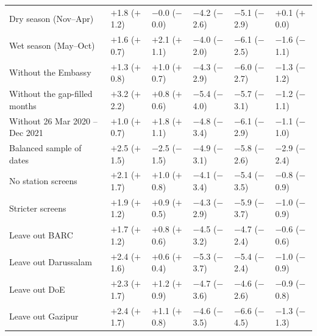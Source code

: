 \begin{longtable}{L{3.8cm} C{2.2cm} C{2.2cm} C{2.2cm} C{2.2cm} C{2.2cm}}
Dry season (Nov--Apr) & $+$1.8 {\scriptsize($+$1.2)} & $-$0.0 {\scriptsize($-$0.0)} & $-$4.2 {\scriptsize($-$2.6)} & $-$5.1 {\scriptsize($-$2.9)} & $+$0.1 {\scriptsize($+$0.0)} \\
Wet season (May--Oct) & $+$1.6 {\scriptsize($+$0.7)} & $+$2.1 {\scriptsize($+$1.1)} & $-$4.0 {\scriptsize($-$2.0)} & $-$6.1 {\scriptsize($-$2.5)} & $-$1.6 {\scriptsize($-$1.1)} \\
Without the Embassy & $+$1.3 {\scriptsize($+$0.8)} & $+$1.0 {\scriptsize($+$0.7)} & $-$4.3 {\scriptsize($-$2.9)} & $-$6.0 {\scriptsize($-$2.7)} & $-$1.3 {\scriptsize($-$1.2)} \\
Without the gap-filled months & $+$3.2 {\scriptsize($+$2.2)} & $+$0.8 {\scriptsize($+$0.6)} & $-$5.4 {\scriptsize($-$4.0)} & $-$5.7 {\scriptsize($-$3.1)} & $-$1.2 {\scriptsize($-$1.1)} \\
Without 26 Mar 2020 -- Dec 2021 & $+$1.0 {\scriptsize($+$0.7)} & $+$1.8 {\scriptsize($+$1.1)} & $-$4.8 {\scriptsize($-$3.4)} & $-$6.1 {\scriptsize($-$2.9)} & $-$1.1 {\scriptsize($-$1.0)} \\
Balanced sample of dates & $+$2.5 {\scriptsize($+$1.5)} & $-$2.5 {\scriptsize($-$1.5)} & $-$4.9 {\scriptsize($-$3.1)} & $-$5.8 {\scriptsize($-$2.6)} & $-$2.9 {\scriptsize($-$2.4)} \\
No station screens & $+$2.1 {\scriptsize($+$1.7)} & $+$1.0 {\scriptsize($+$0.8)} & $-$4.1 {\scriptsize($-$3.4)} & $-$5.4 {\scriptsize($-$3.5)} & $-$0.8 {\scriptsize($-$0.9)} \\
Stricter screens & $+$1.9 {\scriptsize($+$1.2)} & $+$0.9 {\scriptsize($+$0.5)} & $-$4.3 {\scriptsize($-$2.9)} & $-$5.9 {\scriptsize($-$3.7)} & $-$1.0 {\scriptsize($-$0.9)} \\
Leave out BARC & $+$1.7 {\scriptsize($+$1.2)} & $+$0.8 {\scriptsize($+$0.6)} & $-$4.5 {\scriptsize($-$3.2)} & $-$4.7 {\scriptsize($-$2.4)} & $-$0.6 {\scriptsize($-$0.6)} \\
Leave out Darussalam & $+$2.4 {\scriptsize($+$1.6)} & $+$0.6 {\scriptsize($+$0.4)} & $-$5.3 {\scriptsize($-$3.7)} & $-$5.4 {\scriptsize($-$2.4)} & $-$1.0 {\scriptsize($-$0.9)} \\
Leave out DoE & $+$2.3 {\scriptsize($+$1.7)} & $+$1.2 {\scriptsize($+$0.9)} & $-$4.7 {\scriptsize($-$3.6)} & $-$4.6 {\scriptsize($-$2.6)} & $-$0.9 {\scriptsize($-$0.8)} \\
Leave out Gazipur & $+$2.4 {\scriptsize($+$1.7)} & $+$1.1 {\scriptsize($+$0.8)} & $-$4.6 {\scriptsize($-$3.5)} & $-$6.6 {\scriptsize($-$4.5)} & $-$1.3 {\scriptsize($-$1.3)} \\

\end{longtable}
